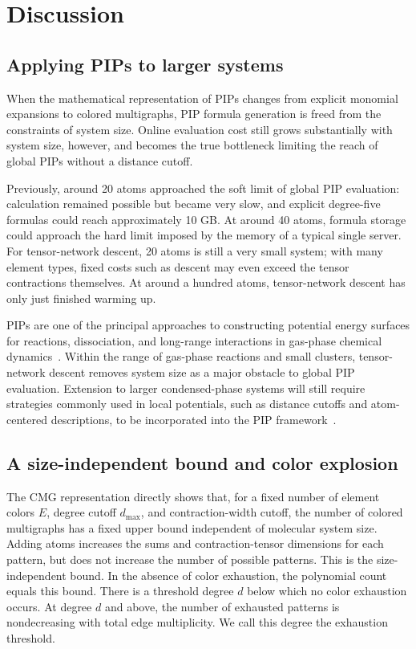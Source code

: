\section{Discussion}\label{sec:discussion}

\subsection{Applying PIPs to larger systems}\label{sec:discussion-system-size}

When the mathematical representation of PIPs changes from explicit monomial expansions to colored multigraphs, PIP formula generation is freed from the constraints of system size. Online evaluation cost still grows substantially with system size, however, and becomes the true bottleneck limiting the reach of global PIPs without a distance cutoff.

Previously, around 20 atoms approached the soft limit of global PIP evaluation: calculation remained possible but became very slow, and explicit degree-five formulas could reach approximately 10 GB. At around 40 atoms, formula storage could approach the hard limit imposed by the memory of a typical single server. For tensor-network descent, 20 atoms is still a very small system; with many element types, fixed costs such as descent may even exceed the tensor contractions themselves. At around a hundred atoms, tensor-network descent has only just finished warming up.

PIPs are one of the principal approaches to constructing potential energy surfaces for reactions, dissociation, and long-range interactions in gas-phase chemical dynamics~\cite{Braams2009PIP,Qu2018PIPReview,Bowman2025PIPPerspective}. Within the range of gas-phase reactions and small clusters, tensor-network descent removes system size as a major obstacle to global PIP evaluation. Extension to larger condensed-phase systems will still require strategies commonly used in local potentials, such as distance cutoffs and atom-centered descriptions, to be incorporated into the PIP framework~\cite{Allen2021aPIP}.

\subsection{A size-independent bound and color explosion}\label{sec:discussion-pattern-count}

The CMG representation directly shows that, for a fixed number of element colors \(E\), degree cutoff \(d_{\max}\), and contraction-width cutoff, the number of colored multigraphs has a fixed upper bound independent of molecular system size. Adding atoms increases the sums and contraction-tensor dimensions for each pattern, but does not increase the number of possible patterns. This is the size-independent bound. In the absence of color exhaustion, the polynomial count equals this bound. There is a threshold degree \(d\) below which no color exhaustion occurs. At degree \(d\) and above, the number of exhausted patterns is nondecreasing with total edge multiplicity. We call this degree the exhaustion threshold.

